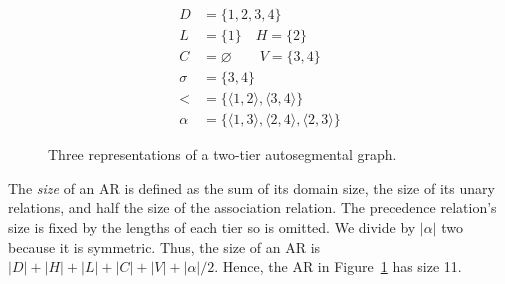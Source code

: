 \documentclass[pmlr]{jmlr}%
\newcommand{\hijeff}[1]{%
	\textcolor{violet}{\textbf{[#1]}}%
}
\newcommand{\hihan}[1]{%
	\textcolor{orange}{\textbf{[#1]}}%
}
\begin{document}
\begin{figure}[t]
\begin{minipage}[c]{0.40\textwidth}
			\[
			\begin{aligned}
				D &= \{1,2,3,4\} \\
				L &= \{1\} \quad H = \{2\} \\
				C &= \varnothing \qquad V = \{3,4\} \\
				\sigma &= \{3,4\} \\
				< &= \{
				\langle 1,2 \rangle,
				\langle 3,4 \rangle
				\} \\
				\alpha &= \{
				\langle 1,3 \rangle,
				\langle 2,4 \rangle,
				\langle 2,3 \rangle
				\}
			\end{aligned}
			\]
			
		\end{minipage}
		
		\caption{
			Three representations of a two-tier autosegmental graph.
		}
		\label{fig:armodel}	
	\end{figure}
	
	The \emph{size} of an AR is defined as the sum of its domain size, the size of its unary relations, and half the size of the association relation.
	The precedence relation's size is fixed by the lengths of each tier so is omitted.
	We divide by \(|\alpha|\) two because it is symmetric.
	Thus, the size of an AR is \(|D| + |H| + |L| + |C| + |V| + |\alpha|/2 \).
	Hence, the AR in Figure~\ref{fig:armodel} has size 11.
	
	
\end{document}
